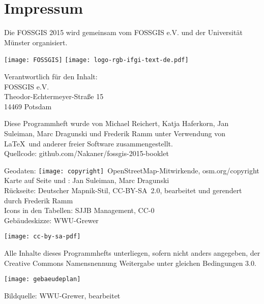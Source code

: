 
\newpage


\newpage
\section*{Impressum}
\label{impressum}
\vspace{-0.5em}


\RaggedRight
Die FOSSGIS 2015 wird gemeinsam vom FOSSGIS e.V. und der Universität Münster 
organisiert.

\vspace{0.5em}
	\texttt{[image: FOSSGIS]}
	\hfill
	\texttt{[image: logo-rgb-ifgi-text-de.pdf]}

\vspace{0.5em}
\noindent Verantwortlich für den Inhalt:\\
FOSSGIS e.V.\\
Theodor-Echtermeyer-Straße 15\\
14469 Potsdam

\vspace{0.5em}
\noindent Diese Programmheft wurde von Michael Reichert, Katja Haferkorn, 
Jan Suleiman, Marc Dragunski und Frederik Ramm unter Verwendung von \LaTeX\ und 
anderer freier Software zusammengestellt.\\
{\small Quellcode: github.com/Nakaner/fossgis-2015-booklet}

\vspace{0.5em}

{\small\noindent Geodaten: \texttt{[image: copyright]}~Open\-Street\-Map-Mitwirkende, osm.org/copyright\\
Karte auf Seite %
und : Jan Suleiman, Marc Dragunski\\
Rückseite: Deutscher Mapnik-Stil, CC-BY-SA~2.0, bearbeitet und gerendert durch Frederik Ramm\\
Icons in den Tabellen: SJJB Management, CC-0\\
Gebäudeskizze: WWU-Grewer
}


\vspace{1em}
\noindent \begin{minipage}[htbp]{0.2\textwidth}
\noindent\texttt{[image: cc-by-sa-pdf]}
\end{minipage}
\hfill
\begin{minipage}[hbtp]{0.74\textwidth}\RaggedRight
Alle Inhalte dieses Programmhefts unterliegen, sofern nicht anders angegeben, 
der Creative Commons Namensnennung Weitergabe unter gleichen Bedingungen 3.0.
\end{minipage}



\begin{landscape}
	\label{gebaeudeplan}
	\texttt{[image: gebaeudeplan]}
	
	{\small Bildquelle: WWU-Grewer, bearbeitet}
\end{landscape}

